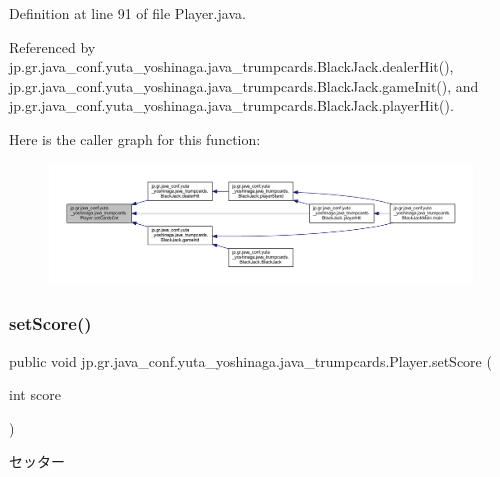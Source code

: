 Definition at line 91 of file Player.\+java.



Referenced by jp.\+gr.\+java\+\_\+conf.\+yuta\+\_\+yoshinaga.\+java\+\_\+trumpcards.\+Black\+Jack.\+dealer\+Hit(), jp.\+gr.\+java\+\_\+conf.\+yuta\+\_\+yoshinaga.\+java\+\_\+trumpcards.\+Black\+Jack.\+game\+Init(), and jp.\+gr.\+java\+\_\+conf.\+yuta\+\_\+yoshinaga.\+java\+\_\+trumpcards.\+Black\+Jack.\+player\+Hit().

Here is the caller graph for this function\+:
\nopagebreak
\begin{figure}[H]
\begin{center}
\leavevmode
\includegraphics[width=350pt]{classjp_1_1gr_1_1java__conf_1_1yuta__yoshinaga_1_1java__trumpcards_1_1_player_a658b393d95e9658b88c8aedcb44a5728_icgraph}
\end{center}
\end{figure}
\mbox{\label{classjp_1_1gr_1_1java__conf_1_1yuta__yoshinaga_1_1java__trumpcards_1_1_player_a6c4e87ec9e1c67bfc9b754690b13c542}} 
\subsubsection{\texorpdfstring{set\+Score()}{setScore()}}
{\footnotesize\ttfamily public void jp.\+gr.\+java\+\_\+conf.\+yuta\+\_\+yoshinaga.\+java\+\_\+trumpcards.\+Player.\+set\+Score (\begin{DoxyParamCaption}\item[{int}]{score }\end{DoxyParamCaption})}



セッター 


